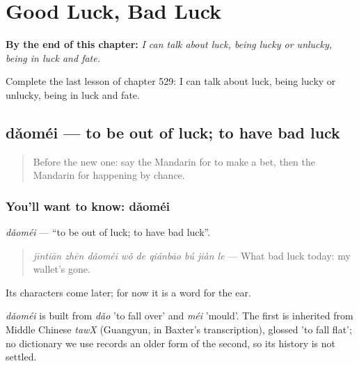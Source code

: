 
\chapter{Good Luck, Bad Luck}
\label{ch:zh-good-luck-bad-luck}

\begin{chapteropening}
\textbf{By the end of this chapter:} \emph{I can talk about luck, being lucky or unlucky, being in luck and fate.}

Complete the last lesson of chapter 529: I can talk about luck, being lucky or unlucky, being in luck and fate.
\end{chapteropening}

\section[dǎoméi]{dǎoméi — to be out of luck; to have bad luck}

\label{lesson:ZH-C529-daomei}



\begin{quote}
Before the new one: say the Mandarin for to make a bet, then the Mandarin for happening by chance.
\end{quote}

\subsection*{You'll want to know: dǎoméi}
\emph{dǎoméi} — \textquotedblleft{}to be out of luck; to have bad luck\textquotedblright{}.

\begin{quote}
\emph{jīntiān zhēn dǎoméi wǒ de qiánbāo bú jiàn le} — What bad luck today: my wallet's gone.
\end{quote}

Its characters come later; for now it is a word for the ear.

\begin{cousinweb}
\emph{dǎoméi} is built from \emph{dǎo} 'to fall over' and \emph{méi} 'mould'. The first is inherited from Middle Chinese \emph{tawX} (Guangyun, in Baxter's transcription), glossed 'to fall flat'; no dictionary we use records an older form of the second, so its history is not settled.
\end{cousinweb}

